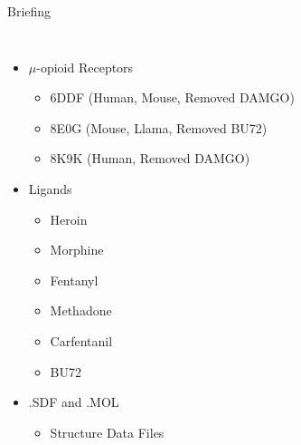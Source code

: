\documentclass[aspectratio=169]{beamer}
\begin{document}
\begin{frame}{Briefing}
    \begin{columns}
            \begin{itemize}
                \item $\mu$-opioid Receptors
                \begin{itemize} \scriptsize
                    \item 6DDF (Human, Mouse, Removed DAMGO)
                    \item 8E0G (Mouse, Llama, Removed BU72)
                    \item 8K9K (Human, Removed DAMGO)
                \end{itemize}
                \item Ligands
                \begin{itemize} \footnotesize
                    \item Heroin
                    \item Morphine
                    \item Fentanyl
                    \item Methadone
                    \item Carfentanil
                    \item BU72
                \end{itemize}
                \item .SDF and .MOL
                \begin{itemize} \footnotesize
                    \item Structure Data Files
                \end{itemize}
            \end{itemize}
        \end{columns}
        
\end{frame}
\end{document}
